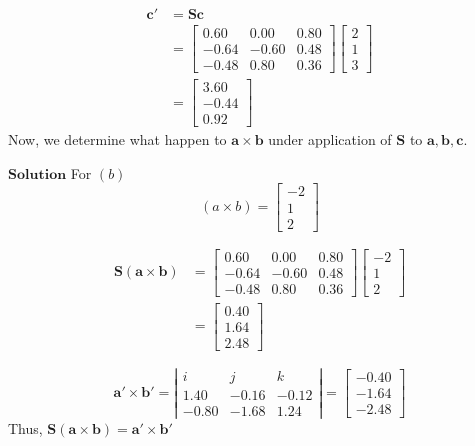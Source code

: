 \documentclass{styles/kaobook}
\begin{document}
$$
\begin{aligned}
\mathbf{c}' &=\mathbf{S} \mathbf{c} \\
&=\begin{bmatrix}
0.60 & 0.00 & 0.80 \\
-0.64 & -0.60 & 0.48 \\
-0.48 & 0.80 & 0.36
\end{bmatrix}\begin{bmatrix}
2 \\
1 \\
3
\end{bmatrix} \\
&=\begin{bmatrix}
3.60 \\
-0.44 \\
0.92
\end{bmatrix}
\end{aligned}
$$
Now, we determine what happen to $\mathbf{a} \times \mathbf{b}$ under application of $\mathbf{S}$ to $\mathbf{a}, \mathbf{b}, \mathbf{c}$.


$\boxed{\textbf{Solution}}$ For $(b)$
$$(a\times b)=\begin{bmatrix}
-2 \\
1 \\
2
\end{bmatrix}$$

$$
\begin{aligned}
\mathbf{S}(\mathbf{a} \times \mathbf{b}) &=\begin{bmatrix}
0.60 & 0.00 & 0.80 \\
-0.64 & -0.60 & 0.48 \\
-0.48 & 0.80 & 0.36
\end{bmatrix}\begin{bmatrix}
-2 \\
1 \\
2
\end{bmatrix} \\
&=\begin{bmatrix}
0.40 \\
1.64 \\
2.48
\end{bmatrix}
\end{aligned}
$$

$$
\mathbf{a}' \times \mathbf{b}'=\left|\begin{array}{ccc}
i & j & k \\
1.40 & -0.16 & -0.12 \\
-0.80 & -1.68 & 1.24
\end{array}\right|=\begin{bmatrix}
-0.40 \\
-1.64 \\
-2.48
\end{bmatrix}
$$
Thus, $\mathbf{S}(\mathbf{a} \times \mathbf{b})=\mathbf{a}' \times \mathbf{b}'$
\end{document}
